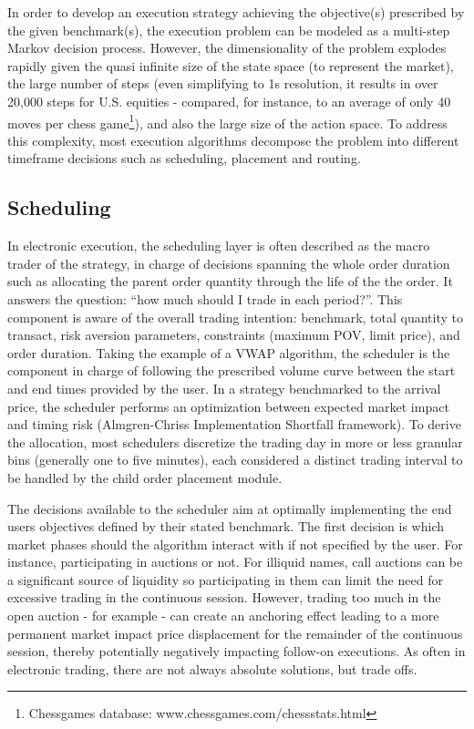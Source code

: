 In order to develop an execution strategy achieving the objective(s) prescribed by the given benchmark(s), the execution problem can be modeled as a multi-step Markov decision process. However, the dimensionality of the problem explodes rapidly given the quasi infinite size of the state space (to represent the market), the large number of steps (even simplifying to 1s resolution, it results in over 20,000 steps for U.S. equities - compared, for instance, to an average of only 40 moves per chess game\footnote{Chessgames database: www.chessgames.com/chessstats.html}), and also the large size of the action space. To address this complexity, most execution algorithms decompose the problem into different timeframe decisions such as scheduling, placement and routing. 


\subsection{Scheduling}

In electronic execution, the scheduling layer is often described as the macro trader of the strategy, in charge of decisions spanning the whole order duration such as allocating the parent order quantity through the life of the the order. It answers the question: “how much should I trade in each period?”.
This component is aware of the overall trading intention: benchmark, total quantity to transact, risk aversion parameters, constraints (maximum POV, limit price), and order duration. Taking the example of a VWAP algorithm, the scheduler is the component in charge of following the prescribed volume curve between the start and end times provided by the user. In a strategy benchmarked to the arrival price, the scheduler performs an optimization between expected market impact and timing risk (Almgren-Chriss Implementation Shortfall framework). To derive the allocation, most schedulers discretize the trading day in more or less granular bins (generally one to five minutes), each considered a distinct trading interval to be handled by the child order placement module.

The decisions available to the scheduler aim at optimally implementing the end users objectives defined by their stated benchmark. The first decision is which market phases should the algorithm interact with if not specified by the user. For instance, participating in auctions or not. For illiquid names, call auctions can be a significant source of liquidity so participating in them can limit the need for excessive trading in the continuous session. However, trading too much in the open auction - for example - can create an anchoring effect leading to a more permanent market impact price displacement for the remainder of the continuous session, thereby potentially negatively impacting follow-on executions. As often in electronic trading, there are not always absolute solutions, but trade offs.

